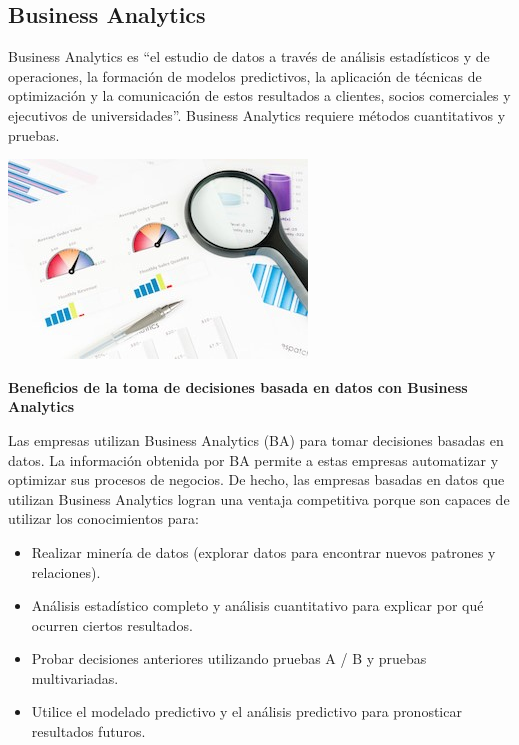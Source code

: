 \subsection{Business Analytics}

Business Analytics es “el estudio de datos a través de análisis estadísticos y de operaciones, la formación de modelos predictivos, la aplicación de técnicas de optimización y la comunicación de estos resultados a clientes, socios comerciales y ejecutivos de universidades”. Business Analytics requiere métodos cuantitativos y pruebas.\newline


\begin{center}
\includegraphics{images/ba/ba-c}\newline
\end{center}

\textbf{Beneficios de la toma de decisiones basada en datos con Business Analytics}\newline

Las empresas utilizan Business Analytics (BA) para tomar decisiones basadas en datos. La información obtenida por BA permite a estas empresas automatizar y optimizar sus procesos de negocios. De hecho, las empresas basadas en datos que utilizan Business Analytics logran una ventaja competitiva porque son capaces de utilizar los conocimientos para:

\begin{itemize}
\item Realizar minería de datos (explorar datos para encontrar nuevos patrones y relaciones).
\item Análisis estadístico completo y análisis cuantitativo para explicar por qué ocurren ciertos resultados.
\item Probar decisiones anteriores utilizando pruebas A / B y pruebas multivariadas.
\item Utilice el modelado predictivo y el análisis predictivo para pronosticar resultados futuros.
\end{itemize}

